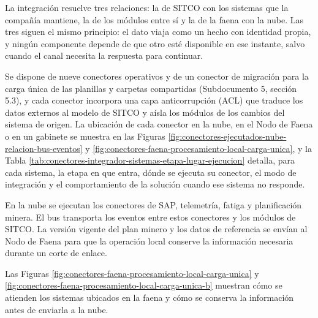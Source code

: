 \documentclass[subdoc]{../../comun/overfore}
\begin{document}
La integración resuelve tres relaciones: la de SITCO con los sistemas que la compañía mantiene, la de los módulos entre sí y la de la faena con la nube. Las tres siguen el mismo principio: el dato viaja como un hecho con identidad propia, y ningún componente depende de que otro esté disponible en ese instante, salvo cuando el canal necesita la respuesta para continuar.

Se dispone de nueve conectores operativos y de un conector de migración para la carga única de las planillas y carpetas compartidas (Subdocumento 5, sección 5.3), y cada conector incorpora una capa anticorrupción (ACL) que traduce los datos externos al modelo de SITCO y aísla los módulos de los cambios del sistema de origen. La ubicación de cada conector en la nube, en el Nodo de Faena o en un gabinete se muestra en las Figuras \ref{fig:conectores-ejecutados-nube-relacion-bus-eventos} y \ref{fig:conectores-faena-procesamiento-local-carga-unica}, y la Tabla \ref{tab:conectores-integrador-sistemas-etapa-lugar-ejecucion} detalla, para cada sistema, la etapa en que entra, dónde se ejecuta su conector, el modo de integración y el comportamiento de la solución cuando ese sistema no responde.

\begin{horizontal}
\end{horizontal}
En la nube se ejecutan los conectores de SAP, telemetría, fatiga y planificación minera. El bus transporta los eventos entre estos conectores y los módulos de SITCO. La versión vigente del plan minero y los datos de referencia se envían al Nodo de Faena para que la operación local conserve la información necesaria durante un corte de enlace.

Las Figuras \ref{fig:conectores-faena-procesamiento-local-carga-unica} y \ref{fig:conectores-faena-procesamiento-local-carga-unica-b} muestran cómo se atienden los sistemas ubicados en la faena y cómo se conserva la información antes de enviarla a la nube.
\end{document}
